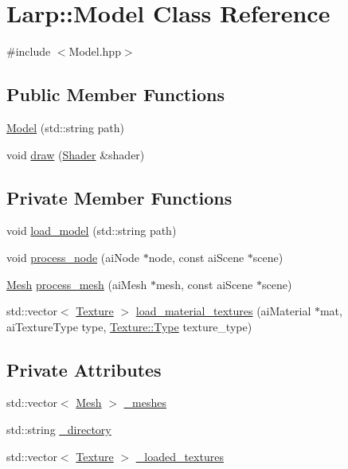 \hypertarget{classLarp_1_1Model}{\section{Larp\-:\-:Model Class Reference}
\label{classLarp_1_1Model}
}


{\ttfamily \#include $<$Model.\-hpp$>$}

\subsection*{Public Member Functions}
\begin{DoxyCompactItemize}
\item 
\hyperlink{classLarp_1_1Model_aa6ec73e894b7d2388bfd0c08bfada774}{Model} (std\-::string path)
\item 
void \hyperlink{classLarp_1_1Model_a042ea3bc2add2d3bbe4f199d070a9619}{draw} (\hyperlink{classLarp_1_1Shader}{Shader} \&shader)
\end{DoxyCompactItemize}
\subsection*{Private Member Functions}
\begin{DoxyCompactItemize}
\item 
void \hyperlink{classLarp_1_1Model_a5c28074e770e1826496458b82651fefd}{load\-\_\-model} (std\-::string path)
\item 
void \hyperlink{classLarp_1_1Model_ad5005f3aa6b553cbcdb9b50cc771ff28}{process\-\_\-node} (ai\-Node $\ast$node, const ai\-Scene $\ast$scene)
\item 
\hyperlink{classLarp_1_1Mesh}{Mesh} \hyperlink{classLarp_1_1Model_a4179a0a55a8a422d6bd1a7f6083a70d4}{process\-\_\-mesh} (ai\-Mesh $\ast$mesh, const ai\-Scene $\ast$scene)
\item 
std\-::vector$<$ \hyperlink{classLarp_1_1Texture}{Texture} $>$ \hyperlink{classLarp_1_1Model_a732230e84175c2e471309bb9b7e08f31}{load\-\_\-material\-\_\-textures} (ai\-Material $\ast$mat, ai\-Texture\-Type type, \hyperlink{classLarp_1_1Texture_aa4e19b5df6a8f1f0eae8235db7e52daa}{Texture\-::\-Type} texture\-\_\-type)
\end{DoxyCompactItemize}
\subsection*{Private Attributes}
\begin{DoxyCompactItemize}
\item 
std\-::vector$<$ \hyperlink{classLarp_1_1Mesh}{Mesh} $>$ \hyperlink{classLarp_1_1Model_ae75758feb59857f6b907bbfa0cf993f2}{\-\_\-meshes}
\item 
std\-::string \hyperlink{classLarp_1_1Model_a568e7aeee510320b2378a0fc57c5c7c5}{\-\_\-directory}
\item 
std\-::vector$<$ \hyperlink{classLarp_1_1Texture}{Texture} $>$ \hyperlink{classLarp_1_1Model_ac5e40faa76039650ae6b32828b8681f9}{\-\_\-loaded\-\_\-textures}
\end{DoxyCompactItemize}


